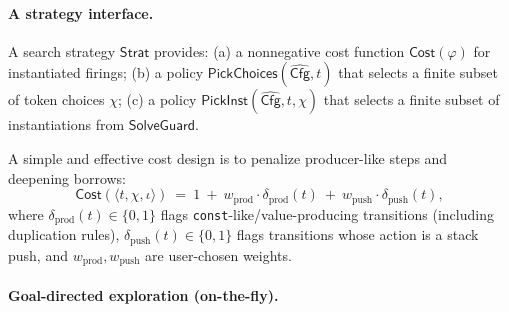 \documentclass[runningheads]{llncs}
\newcommand{\Cfg}{\mathsf{Cfg}}
\newcommand{\SolveGuard}{\mathsf{SolveGuard}}
\begin{document}
\paragraph{A strategy interface.}
A search strategy $\mathsf{Strat}$ provides:
(a) a nonnegative cost function $\mathsf{Cost}(\varphi)$ for instantiated firings;
(b) a policy $\mathsf{PickChoices}(\widehat{\Cfg},t)$ that selects a finite subset of token choices $\chi$;
(c) a policy $\mathsf{PickInst}(\widehat{\Cfg},t,\chi)$ that selects a finite subset of instantiations from $\SolveGuard$.

A simple and effective cost design is to penalize producer-like steps and deepening borrows:
\[
\mathsf{Cost}(\langle t,\chi,\iota\rangle)
~=~
1
~+~
w_{\mathrm{prod}}\cdot \delta_{\mathrm{prod}}(t)
~+~
w_{\mathrm{push}}\cdot \delta_{\mathrm{push}}(t),
\]
where $\delta_{\mathrm{prod}}(t)\in\{0,1\}$ flags \texttt{const}-like/value-producing transitions (including duplication rules),
$\delta_{\mathrm{push}}(t)\in\{0,1\}$ flags transitions whose action is a stack push, and $w_{\mathrm{prod}},w_{\mathrm{push}}$ are
user-chosen weights.

\paragraph{Goal-directed exploration (on-the-fly).}
\end{document}
